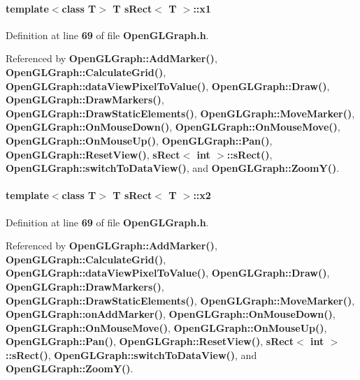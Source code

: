 \paragraph[{x1}]{\setlength{\rightskip}{0pt plus 5cm}template$<$class T$>$ T {\bf s\+Rect}$<$ T $>$\+::x1}\label{structsRect_a2dda0d088cf32b8cd66f2bab69606872}


Definition at line {\bf 69} of file {\bf Open\+G\+L\+Graph.\+h}.



Referenced by {\bf Open\+G\+L\+Graph\+::\+Add\+Marker()}, {\bf Open\+G\+L\+Graph\+::\+Calculate\+Grid()}, {\bf Open\+G\+L\+Graph\+::data\+View\+Pixel\+To\+Value()}, {\bf Open\+G\+L\+Graph\+::\+Draw()}, {\bf Open\+G\+L\+Graph\+::\+Draw\+Markers()}, {\bf Open\+G\+L\+Graph\+::\+Draw\+Static\+Elements()}, {\bf Open\+G\+L\+Graph\+::\+Move\+Marker()}, {\bf Open\+G\+L\+Graph\+::\+On\+Mouse\+Down()}, {\bf Open\+G\+L\+Graph\+::\+On\+Mouse\+Move()}, {\bf Open\+G\+L\+Graph\+::\+On\+Mouse\+Up()}, {\bf Open\+G\+L\+Graph\+::\+Pan()}, {\bf Open\+G\+L\+Graph\+::\+Reset\+View()}, {\bf s\+Rect$<$ int $>$\+::s\+Rect()}, {\bf Open\+G\+L\+Graph\+::switch\+To\+Data\+View()}, and {\bf Open\+G\+L\+Graph\+::\+Zoom\+Y()}.

\paragraph[{x2}]{\setlength{\rightskip}{0pt plus 5cm}template$<$class T$>$ T {\bf s\+Rect}$<$ T $>$\+::x2}\label{structsRect_a9f17bfb9deb85f9ccc3423ec418652ea}


Definition at line {\bf 69} of file {\bf Open\+G\+L\+Graph.\+h}.



Referenced by {\bf Open\+G\+L\+Graph\+::\+Add\+Marker()}, {\bf Open\+G\+L\+Graph\+::\+Calculate\+Grid()}, {\bf Open\+G\+L\+Graph\+::data\+View\+Pixel\+To\+Value()}, {\bf Open\+G\+L\+Graph\+::\+Draw()}, {\bf Open\+G\+L\+Graph\+::\+Draw\+Markers()}, {\bf Open\+G\+L\+Graph\+::\+Draw\+Static\+Elements()}, {\bf Open\+G\+L\+Graph\+::\+Move\+Marker()}, {\bf Open\+G\+L\+Graph\+::on\+Add\+Marker()}, {\bf Open\+G\+L\+Graph\+::\+On\+Mouse\+Down()}, {\bf Open\+G\+L\+Graph\+::\+On\+Mouse\+Move()}, {\bf Open\+G\+L\+Graph\+::\+On\+Mouse\+Up()}, {\bf Open\+G\+L\+Graph\+::\+Pan()}, {\bf Open\+G\+L\+Graph\+::\+Reset\+View()}, {\bf s\+Rect$<$ int $>$\+::s\+Rect()}, {\bf Open\+G\+L\+Graph\+::switch\+To\+Data\+View()}, and {\bf Open\+G\+L\+Graph\+::\+Zoom\+Y()}.

